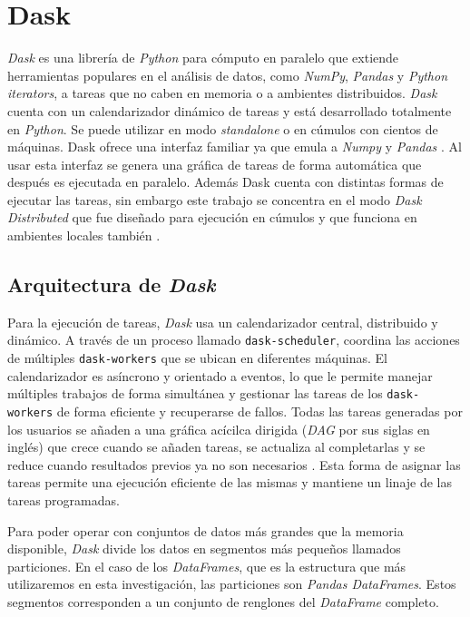\section{Dask}

\textit{Dask} es una librería de \textit{Python} para cómputo en paralelo que extiende herramientas populares en el análisis de datos, como \textit{NumPy}, \textit{Pandas} y \textit{Python iterators}, a tareas que no caben en memoria o a ambientes distribuidos. \textit{Dask} cuenta con un calendarizador dinámico de tareas y está desarrollado totalmente en \textit{Python}. Se puede utilizar en modo \textit{standalone} o en cúmulos con cientos de máquinas. Dask ofrece una interfaz familiar ya que emula a \textit{Numpy} y \textit{Pandas} \cite{daskdocs}. Al usar esta interfaz se genera una gráfica de tareas de forma automática que después es ejecutada en paralelo. Además Dask cuenta con distintas formas de ejecutar las tareas, sin embargo este trabajo se concentra en el modo \textit{Dask Distributed} que fue diseñado para ejecución en cúmulos y que funciona en ambientes locales también \cite{daskscheduling}.

\subsection{Arquitectura de \textit{Dask}}

Para la ejecución de tareas, \textit{Dask} usa un calendarizador central, distribuido y dinámico. A través de un proceso llamado \texttt{dask-scheduler}, coordina las acciones de múltiples \texttt{dask-workers} que se ubican en diferentes máquinas. El calendarizador es asíncrono y orientado a eventos, lo que le permite manejar múltiples trabajos de forma simultánea y gestionar las tareas de los \texttt{dask-workers} de forma eficiente y recuperarse de fallos. Todas las tareas generadas por los usuarios se añaden a una gráfica acícilca dirigida (\textit{DAG} por sus siglas en inglés) que crece cuando se añaden tareas, se actualiza al completarlas y se reduce cuando resultados previos ya no son necesarios \cite{daskdistributed}. Esta forma de asignar las tareas permite una ejecución eficiente de las mismas y mantiene un linaje de las tareas programadas.

Para poder operar con conjuntos de datos más grandes que la memoria disponible, \textit{Dask} divide los datos en segmentos más pequeños llamados particiones. En el caso de los \textit{DataFrames}, que es la estructura que más utilizaremos en esta investigación, las particiones son \textit{Pandas DataFrames}. Estos segmentos corresponden a un conjunto de renglones del \textit{DataFrame} completo.


